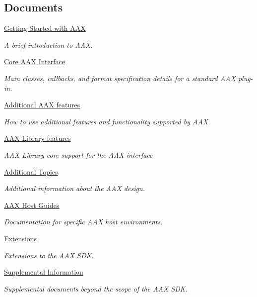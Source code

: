   \subsection*{Documents}
\begin{DoxyCompactItemize}
\item 
\hyperlink{a00324}{Getting Started with A\+A\+X}
\begin{DoxyCompactList}\small\item\em A brief introduction to A\+A\+X. \end{DoxyCompactList}\item 
\hyperlink{a00325}{Core A\+A\+X Interface}
\begin{DoxyCompactList}\small\item\em Main classes, callbacks, and format specification details for a standard A\+A\+X plug-\/in. \end{DoxyCompactList}\item 
\hyperlink{a00332}{Additional A\+A\+X features}
\begin{DoxyCompactList}\small\item\em How to use additional features and functionality supported by A\+A\+X. \end{DoxyCompactList}\item 
\hyperlink{a00343}{A\+A\+X Library features}
\begin{DoxyCompactList}\small\item\em A\+A\+X Library core support for the A\+A\+X interface \end{DoxyCompactList}\item 
\hyperlink{a00348}{Additional Topics}
\begin{DoxyCompactList}\small\item\em Additional information about the A\+A\+X design. \end{DoxyCompactList}\item 
\hyperlink{a00359}{A\+A\+X Host Guides}
\begin{DoxyCompactList}\small\item\em Documentation for specific A\+A\+X host environments. \end{DoxyCompactList}\item 
\hyperlink{a00367}{Extensions}
\begin{DoxyCompactList}\small\item\em Extensions to the A\+A\+X S\+D\+K. \end{DoxyCompactList}\item 
\hyperlink{a00371}{Supplemental Information}
\begin{DoxyCompactList}\small\item\em Supplemental documents beyond the scope of the A\+A\+X S\+D\+K. \end{DoxyCompactList}\end{DoxyCompactItemize}
